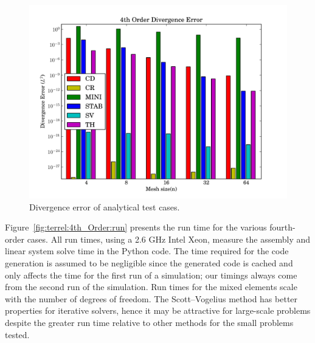 \begin{figure}
  \center\includegraphics[width=\largefig]{chapters/terrel/pdf/div_4.pdf}
  \caption{Divergence error of analytical test cases.}
  \label{fig:terrel:4th_Order:div}
\end{figure}

Figure~\ref{fig:terrel:4th_Order:run} presents the run time for the
various fourth-order cases.  All run times, using a 2.6 GHz Intel
Xeon, measure the assembly and linear system solve time in the Python
code. The time required for the code generation is assumed to be
negligible since the generated code is cached and only affects the
time for the first run of a simulation; our timings always come from
the second run of the simulation.  Run times for the mixed elements
scale with the number of degrees of freedom. The Scott--Vogelius
method has better properties for iterative solvers, hence it may be
attractive for large-scale problems despite the greater run time
relative to other methods for the small problems tested.


